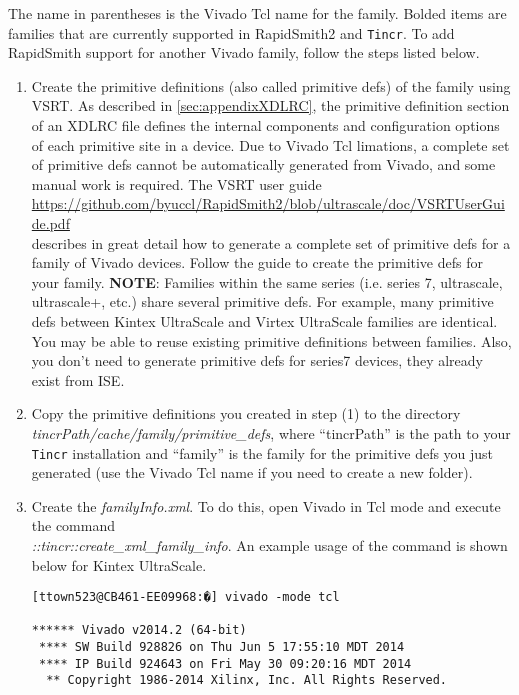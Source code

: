 \noindent The name in parentheses is the Vivado Tcl name for the family. Bolded
items are families that are currently supported in RapidSmith2 and
\texttt{Tincr}. To add RapidSmith support for another Vivado family, follow the
steps listed below.

\begin {enumerate}
  \item Create the primitive definitions (also called primitive defs) of the
  family using VSRT. As described in \autoref{sec:appendixXDLRC}, the primitive
  definition section of an XDLRC file defines the internal components and
  configuration options of each primitive site in a device. Due to Vivado Tcl
  limations, a complete set of primitive defs cannot be automatically generated from Vivado,
  and some manual work is required. The VSRT user guide 
  {\color{blue}\url{https://github.com/byuccl/RapidSmith2/blob/ultrascale/doc/VSRTUserGuide.pdf}}\\ 
  describes in great detail how to generate a complete set of primitive defs
  for a family of Vivado devices. Follow the guide to create the primitive defs
  for your family. \textbf{NOTE}: Families within the same series (i.e. series
  7, ultrascale, ultrascale+, etc.) share several primitive defs. For example,
  many primitive defs between Kintex UltraScale and Virtex UltraScale families
  are identical. You may be able to reuse existing primitive definitions
  between families. Also, you don't need to generate primitive defs for series7
  devices, they already exist from ISE.
  
  \item Copy the primitive definitions you created in step (1) to the
   directory \textit{tincrPath/cache/family/primitive\_defs}, where
   ``tincrPath'' is the path to your \texttt{Tincr} installation and ``family'' is the family
   for the primitive defs you just generated (use the Vivado Tcl name if you
   need to create a new folder).
   
   \item Create the \textit{familyInfo.xml}. To do this, open Vivado in Tcl mode
   and execute the command \\
   \textit{::tincr::create\_xml\_family\_info}. An example usage of the command
   is shown below for Kintex UltraScale. 
   
\begin{lstlisting}[numbers=none]
[ttown523@CB461-EE09968:�] vivado -mode tcl

****** Vivado v2014.2 (64-bit)
 **** SW Build 928826 on Thu Jun 5 17:55:10 MDT 2014
 **** IP Build 924643 on Fri May 30 09:20:16 MDT 2014
  ** Copyright 1986-2014 Xilinx, Inc. All Rights Reserved.


\end{lstlisting}
\end{enumerate}

